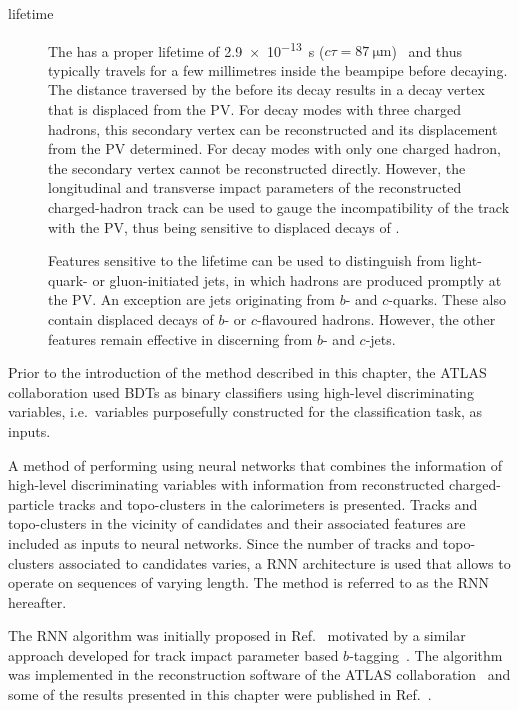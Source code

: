 \begin{description}
\item[\taulepton lifetime] The \taulepton has a proper lifetime of
  \SI{2.9e-13}{\second} ($c \tau = \SI{87}{\micro\metre}$)~\cite{pdg2020} and
  thus typically travels for a few millimetres inside the beampipe before
  decaying. The distance traversed by the \taulepton before its decay results in
  a decay vertex that is displaced from the PV. For \taulepton decay modes with
  three charged hadrons, this secondary vertex can be reconstructed and its
  displacement from the PV determined. For decay modes with only one charged
  hadron, the secondary vertex cannot be reconstructed directly. However, the
  longitudinal and transverse impact parameters of the reconstructed
  charged-hadron track can be used to gauge the incompatibility of the track
  with the PV, thus being sensitive to displaced decays of \tauleptons.

  Features sensitive to the \taulepton lifetime can be used to distinguish
  \tauhad from light-quark- or gluon-initiated jets, in which hadrons are
  produced promptly at the PV. An exception are jets originating from $b$- and
  $c$-quarks. These also contain displaced decays of $b$- or $c$-flavoured
  hadrons. However, the other features remain effective in discerning \tauhad
  from $b$- and $c$-jets.

\end{description}
Prior to the introduction of the method described in this chapter, the
ATLAS collaboration used BDTs as binary classifiers using high-level
discriminating variables, i.e.\ variables purposefully constructed for
the classification task, as inputs.

A method of performing \tauid using neural networks that combines the
information of high-level discriminating variables with information from
reconstructed charged-particle tracks and topo-clusters in the calorimeters is
presented. Tracks and topo-clusters in the vicinity of \tauhadvis candidates and
their associated features are included as inputs to neural networks. Since the
number of tracks and topo-clusters associated to \tauhadvis candidates varies, a
RNN architecture is used that allows to operate on sequences of varying
length. The method is referred to as the RNN \tauid hereafter.

The RNN \tauid algorithm was initially proposed in Ref.~\cite{cdeutsch-master}
motivated by a similar approach developed for track impact parameter based
$b$-tagging~\cite{ATL-PHYS-PUB-2017-003}. The algorithm was implemented in the
reconstruction software of the ATLAS collaboration~\cite{ATL-SOFT-PUB-2021-001}
and some of the results presented in this chapter were published in
Ref.~\cite{ATL-PHYS-PUB-2019-033}.

